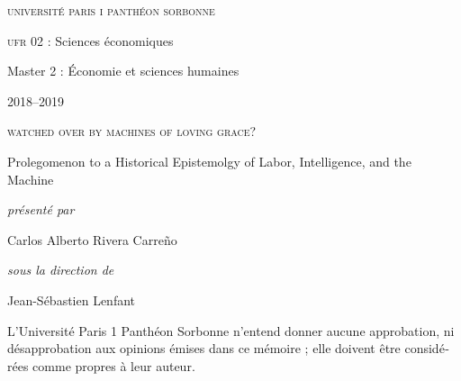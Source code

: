 \begin{titlepage}
 \centering
\begin{french}
 {\large \textsc{université paris i panthéon sorbonne} \par}
  \vspace*{0.01\textheight}
 {\large \textsc{ufr} 02 : Sciences économiques  \par}
  \vspace*{0.01\textheight}
 {\large Master 2 : Économie et sciences humaines \par}
  \vspace*{0.01\textheight}
 {\large 2018--2019 \par}
\end{french}
  \vspace*{0.3\textheight}
 {\huge \textsc{watched over by machines of loving grace?}  \par}
  \vspace*{0.02\textheight}
 {\Large Prolegomenon to a Historical Epistemolgy of  Labor, Intelligence, and the Machine \par}
\vfill
\begin{french}
 {\large\itshape présenté par  \par}
\end{french}
 {\Large Carlos Alberto Rivera Carreño \par}
  \vspace*{0.05\textheight}
\begin{french}
 {\large\itshape sous la direction de \par}
\end{french}
 {\Large Jean-Sébastien Lenfant \par}
\end{titlepage}

\pagestyle{empty}

\begin{french}
L'Université Paris 1 Panthéon Sorbonne n'entend donner aucune approbation,
ni désapprobation aux opinions émises dans ce mémoire ; elle doivent être
considérées comme propres à leur auteur. 
\end{french}
\vfill

